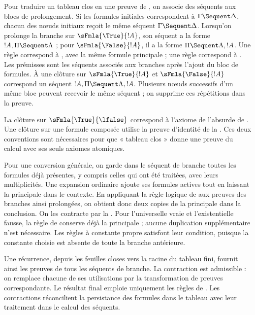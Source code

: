 \documentclass[../../../include/open-logic-section]{subfiles}
\begin{document}
Pour traduire un tableau clos en une preuve
de , on associe des séquents aux
blocs de prolongement. Si les formules initiales
correspondent à $\Gamma \Sequent \Delta$,
chacun des nœuds initiaux reçoit le même
séquent $\Gamma \Sequent \Delta$.
Lorsqu'on prolonge la branche sur
$\sFmla{\True}{!A}$, son séquent a la forme
$!A, \Pi \Sequent \Lambda$ ; pour
$\sFmla{\False}{!A}$, il a la forme
$\Pi \Sequent \Lambda, !A$.
Une règle \TRule{\True}{\star} correspond
à \LeftR{\star}, avec la même formule
principale ; une règle \TRule{\False}{\star}
correspond à \RightR{\star}.
Les prémisses sont les séquents associés
aux branches après l'ajout du bloc de formules.
À une clôture sur $\sFmla{\True}{!A}$
et $\sFmla{\False}{!A}$ correspond un
séquent $!A, \Pi \Sequent \Lambda, !A$.
Plusieurs nœuds successifs d'un même bloc
peuvent recevoir le même séquent ; on
supprime ces répétitions dans la preuve.

La clôture sur $\sFmla{\True}{\lfalse}$
%
correspond à l'axiome de l'absurde de .
Une clôture sur une formule composée utilise
la preuve d'identité de la
.
Ces deux conventions sont nécessaires pour
que « tableau clos » donne une preuve du
calcul avec ses seuls axiomes atomiques.

Pour une conversion générale, on garde
dans le séquent de branche toutes les
formules déjà présentes, y compris celles
qui ont été traitées, avec leurs multiplicités.
Une expansion ordinaire ajoute ses formules
actives tout en laissant la principale dans
le contexte. En appliquant la règle logique
de  aux preuves des branches ainsi
prolongées, on obtient donc deux copies
de la principale dans la conclusion.
On les contracte par la
.
Pour l'universelle vraie et l'existentielle
fausse, la règle de  conserve déjà
la principale ; aucune duplication
supplémentaire n'est nécessaire.
Les règles à constante propre satisfont
leur condition, puisque la constante choisie
est absente de toute la branche antérieure.

Une récurrence, depuis les feuilles closes
vers la racine du tableau fini, fournit ainsi
les preuves de tous les séquents de branche.
La contraction est admissible : on remplace
chacune de ses utilisations par la transformation
de preuves correspondante. Le résultat final
emploie uniquement les règles de .
Les contractions réconcilient la persistance des
formules dans le tableau avec leur traitement
%
dans le calcul des séquents.
\end{document}
